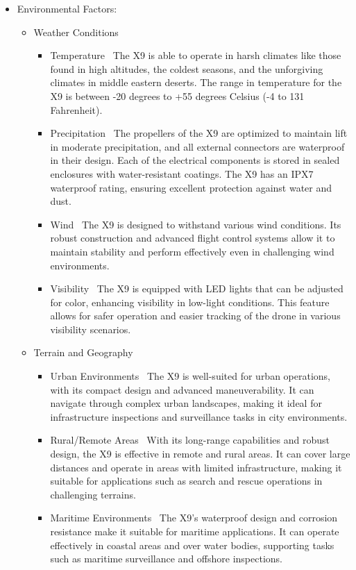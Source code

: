 \begin{itemize}
    \item Environmental Factors:
    \begin{itemize}
    \item Weather Conditions
    \begin{itemize}
    \item Temperature \
    The X9 is able to operate in harsh climates like those found in high altitudes, the coldest seasons, and the unforgiving climates in middle eastern deserts. The range in temperature for the X9 is between -20 degrees to +55 degrees Celsius (-4 to 131 Fahrenheit).
    \item Precipitation \
    The propellers of the X9 are optimized to maintain lift in moderate precipitation, and all external connectors are waterproof in their design. Each of the electrical components is stored in sealed enclosures with water-resistant coatings. The X9 has an IPX7 waterproof rating, ensuring excellent protection against water and dust.
    \item Wind \
    The X9 is designed to withstand various wind conditions. Its robust construction and advanced flight control systems allow it to maintain stability and perform effectively even in challenging wind environments.
    \item Visibility \
    The X9 is equipped with LED lights that can be adjusted for color, enhancing visibility in low-light conditions. This feature allows for safer operation and easier tracking of the drone in various visibility scenarios.
    \end{itemize}
    \item Terrain and Geography
    \begin{itemize}
    \item Urban Environments \
    The X9 is well-suited for urban operations, with its compact design and advanced maneuverability. It can navigate through complex urban landscapes, making it ideal for infrastructure inspections and surveillance tasks in city environments.
    \item Rural/Remote Areas \
    With its long-range capabilities and robust design, the X9 is effective in remote and rural areas. It can cover large distances and operate in areas with limited infrastructure, making it suitable for applications such as search and rescue operations in challenging terrains.
    \item Maritime Environments \
    The X9's waterproof design and corrosion resistance make it suitable for maritime applications. It can operate effectively in coastal areas and over water bodies, supporting tasks such as maritime surveillance and offshore inspections.

\end{itemize}
\end{itemize}
\end{itemize}

